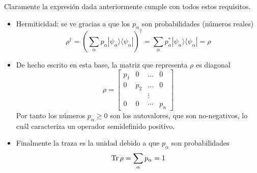 \documentclass[a4paper,11pt]{book} %
\numberwithin{equation}{chapter}
\newcommand{\ketbra}[2]{| #1\rangle \! \langle #2|}
\begin{document}
Claramente la expresión dada anteriormente cumple con todos estos requisitos. 
\begin{itemize}
	\item Hermiticidad: se ve gracias a que los $p_\alpha$ son probabilidades (números reales)
	\begin{equation}
	\rho^\dagger = \left(\sum_\alpha p_\alpha \ketbra{\psi_\alpha}{\psi_\alpha}\right)^\dagger = 
\sum_\alpha p^*_\alpha \ketbra{\psi_\alpha}{\psi_\alpha} = \rho
	\end{equation}

	\item De hecho escrito en esta base, la matriz que representa $\rho$ es diagonal
	\begin{equation}
	\rho = \begin{bmatrix} p_1& 0 & ... & 0 \\ 0 & p_2 & ... & 0 \\ & &\vdots  & \\ 0 & 0 & \cdots & p_n  
\end{bmatrix}
	\end{equation}
Por tanto los números $p_\alpha\geq 0$ son los autovalores, que son no-negativos, lo cuál caracteriza un operador semidefinido positivo. 

	\item Finalmente la traza es la unidad debido a que $p_\alpha$ son probabilidades
	\begin{equation}
	{\rm Tr}\, \rho = \sum_\alpha p_\alpha = 1
	\end{equation}

\end{itemize}
\end{document}
